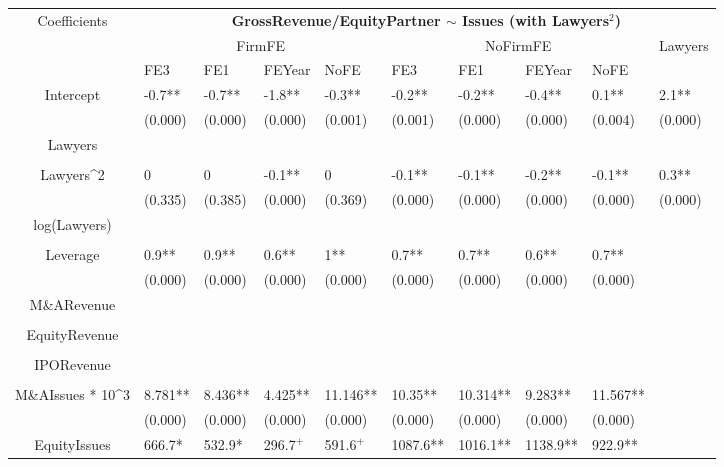 \documentclass{article}
\begin{document}
\begin{table}[H]
\centering
\begin{tabular}{|clllllllll|}
\hline
\multirow{3}{*}{Coefficients} & \multicolumn{9}{c|}{\textbf{GrossRevenue/EquityPartner $\sim$ Issues (with Lawyers$^2$)}} \\
\cline{2-10}
& \multicolumn{4}{c}{FirmFE} & \multicolumn{4}{c}{NoFirmFE} & \multirow{2}{*}{Lawyers} \\
\cline{2-9}
& FE3 & FE1 & FEYear & NoFE & FE3 & FE1 & FEYear & NoFE &  \\
\hline
 
Intercept & -0.7** & -0.7** & -1.8** & -0.3** & -0.2** & -0.2** & -0.4** & 0.1** & 2.1** \\ 
   & (0.000) & (0.000) & (0.000) & (0.001) & (0.001) & (0.000) & (0.000) & (0.004) & (0.000) \\ 
  Lawyers &  &  &  &  &  &  &  &  &  \\ 
   &  &  &  &  &  &  &  &  &  \\ 
  Lawyers^2 & 0 & 0 & -0.1** & 0 & -0.1** & -0.1** & -0.2** & -0.1** & 0.3** \\ 
   & (0.335) & (0.385) & (0.000) & (0.369) & (0.000) & (0.000) & (0.000) & (0.000) & (0.000) \\ 
  log(Lawyers) &  &  &  &  &  &  &  &  &  \\ 
   &  &  &  &  &  &  &  &  &  \\ 
  Leverage & 0.9** & 0.9** & 0.6** & 1** & 0.7** & 0.7** & 0.6** & 0.7** &  \\ 
   & (0.000) & (0.000) & (0.000) & (0.000) & (0.000) & (0.000) & (0.000) & (0.000) &  \\ 
  M\&ARevenue &  &  &  &  &  &  &  &  &  \\ 
   &  &  &  &  &  &  &  &  &  \\ 
  EquityRevenue &  &  &  &  &  &  &  &  &  \\ 
   &  &  &  &  &  &  &  &  &  \\ 
  IPORevenue &  &  &  &  &  &  &  &  &  \\ 
   &  &  &  &  &  &  &  &  &  \\ 
  M\&AIssues * 10^3 & 8.781** & 8.436** & 4.425** & 11.146** & 10.35** & 10.314** & 9.283** & 11.567** &  \\ 
   & (0.000) & (0.000) & (0.000) & (0.000) & (0.000) & (0.000) & (0.000) & (0.000) &  \\ 
  EquityIssues & 666.7* & 532.9* & 296.7$^{+}$ & 591.6$^{+}$ & 1087.6** & 1016.1** & 1138.9** & 922.9** &  \\ 

\end{tabular}
\end{table}
\end{document}
